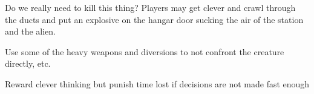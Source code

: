  
\begin{rpg-commentbox}{Do we really need to kill this thing?}
    Players may get clever and crawl through the ducts and put an explosive on the hangar door sucking the air of the station and the alien. 
    
    Use some of the heavy weapons and diversions to not confront the creature directly, etc.

    Reward clever thinking but punish time lost if decisions are not made fast enough
 \end{rpg-commentbox}